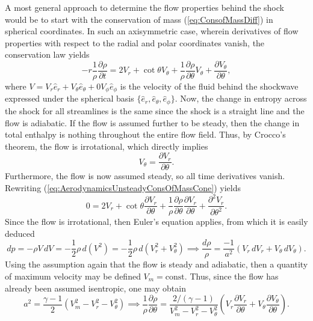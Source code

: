 \documentclass[11pt,dvipsnames]{thesis}
\begin{document}
A most general approach to determine the flow properties behind the shock would be to start with the conservation of mass (\ref{eq:ConsofMassDiff}) in spherical coordinates. In such an axisymmetric case, wherein derivatives of flow properties with respect to the radial and polar coordinates vanish, the conservation law yields
\begin{equation}
-r\frac{1}{\rho}\frac{\partial \rho}{\partial t} = 2 V_r + \cot\theta V_\theta + \frac{1}{\rho}\frac{\partial \rho}{\partial \theta}V_\theta + \frac{\partial V_\theta}{\partial \theta}, \label{eq:AerodynamicsUnsteadyConsOfMassCone}
\end{equation}
where $V = V_r \hat{e}_r + V_\theta \hat{e}_\theta + 0 V_\phi \hat{e}_\phi$ is the velocity of the fluid behind the shockwave expressed under the spherical basis $\{\hat{e}_r, \hat{e}_\theta, \hat{e}_\phi\}$. 
Now, the change in entropy across the shock for all streamlines is the same since the shock is a straight line and the flow is adiabatic. If the flow is assumed further to be steady, then the change in total enthalpy is nothing throughout the entire flow field. Thus, by Crocco's theorem, the flow is irrotational, which directly implies
\begin{equation}
V_\theta = \frac{\partial V_r}{\partial \theta}.
\end{equation}
Furthermore, the flow is now assumed steady, so all time derivatives vanish. Rewriting (\ref{eq:AerodynamicsUnsteadyConsOfMassCone}) yields
\begin{equation}
0 = 2 V_r + \cot\theta \frac{\partial V_r}{\partial \theta} + \frac{1}{\rho} \frac{\partial\rho}{\partial\theta} \frac{\partial V_r}{\partial \theta} + \frac{\partial^2 V_r}{\partial \theta^2}. \label{eq:AerodynamicsSteadyConsOfMassCone}
\end{equation}
Since the flow is irrotational, then Euler's equation applies, from which it is easily deduced
\begin{equation}
dp = -\rho V \,dV = -\frac{1}{2} \rho \,d(V^2) = -\frac{1}{2} \rho \,d(V_r^2 + V_\theta^2) \implies \frac{d\rho}{\rho} = \frac{-1}{a^2} \left(V_r \,dV_r + V_\theta \,dV_\theta\right).
\end{equation}
Using the assumption again that the flow is steady and adiabatic, then a quantity of maximum velocity may be defined $V_m = \mathrm{const.}$
Thus, since the flow has already been assumed isentropic, one may obtain
\begin{equation}
a^2 = \frac{\gamma - 1}{2} (V_m^2 - V_r^2 - V_\theta^2) \implies \frac{1}{\rho} \frac{\partial \rho}{\partial \theta} = \frac{2 / (\gamma - 1)}{V_m^2 - V_r^2 - V_\theta^2} \left(V_r \frac{\partial V_r}{\partial \theta} + V_\theta \frac{\partial V_\theta}{\partial\theta}\right).
\end{equation}
\end{document}
